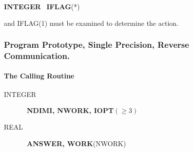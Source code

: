 \documentclass[twoside]{MATH77}
\begin{document}
{\bf INTEGER} \ {\bf IFLAG}(*)

and IFLAG(1) must be examined to determine the action.

\subsubsection{Program Prototype, Single Precision, Reverse Communication.
\label{PPRC}}

\paragraph{The Calling Routine\label{CallingRC}}

\begin{description}
\item[INTEGER] \  {\bf NDIMI, NWORK, IOPT}$(\geq 3)$

\item[REAL] \  {\bf ANSWER, WORK}(NWORK)
\end{description}
\end{document}
